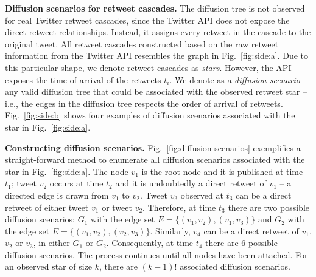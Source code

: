 \textbf{Diffusion scenarios for retweet cascades.}
The diffusion tree is not observed for real Twitter retweet cascades, since the Twitter API does not expose the direct retweet relationships.
Instead, it assigns every retweet in the cascade to the original tweet.
All retweet cascades constructed based on the raw retweet information from the Twitter API resembles the graph in Fig.~\ref{fig:side:a}.
Due to this particular shape, we denote retweet cascades as \emph{stars}.
However, the API exposes the time of arrival of the retweets $t_i$.
We denote as a \emph{diffusion scenario} any valid diffusion tree that could be associated with the observed retweet star -- i.e., the edges in the diffusion tree respects the order of arrival of retweets.
Fig.~\ref{fig:side:b} shows four examples of diffusion scenarios associated with the star in Fig.~\ref{fig:side:a}.

\textbf{Constructing diffusion scenarios.}
Fig.~\ref{fig:diffusion-scenarios} exemplifies a straight-forward method to enumerate all diffusion scenarios associated with the star in Fig.~\ref{fig:side:a}.
The node $v_1$ is the root node and it is published at time $t_1$;
tweet $v_2$ occurs at time $t_2$ and it is undoubtedly a direct retweet of $v_1$ -- a directed edge is drawn from $v_1$ to $v_2$. 
Tweet $v_3$ observed at $t_3$ can be a direct retweet of either tweet $v_1$ or tweet $v_2$.
Therefore, at time $t_3$ there are two possible diffusion scenarios: 
$G_1$ with the edge set $E = \lbrace (v_1, v_2), (v_1, v_3) \rbrace$ and $G_2$ with the edge set $E = \lbrace (v_1, v_2), (v_2, v_3) \rbrace$.
Similarly, $v_4$ can be a direct retweet of $v_1$, $v_2$ or $v_3$, in either $G_1$ or $G_2$.
Consequently, at time $t_4$ there are 6 possible diffusion scenarios.
The process continues until all nodes have been attached.
For an observed star of size $k$, there are $(k-1)!$ associated diffusion scenarios.

